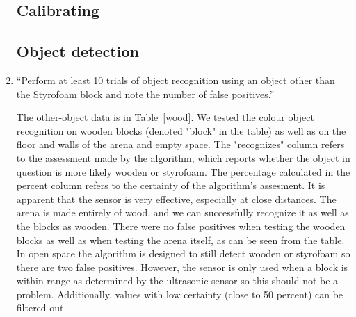 \documentclass[twocolumn]{article}
\begin{document}
\begin{enumerate}

\subsection{Calibrating}









\subsection{Object detection}

\item
``Perform at least 10 trials of object recognition using an object other than the Styrofoam block and note the number of false positives.\cite{lab5}''

The other-object data is in Table~\ref{wood}. We tested the colour object recognition on wooden blocks (denoted "block" in the table) as well as on the floor and walls of the arena and empty space. The "recognizes" column refers to the assessment made by the algorithm, which reports whether the object in question is more likely wooden or styrofoam. The percentage calculated in the percent column refers to the certainty of the algorithm's assesment. It is apparent that the sensor is very effective, especially at close distances. The arena is made entirely of wood, and we can successfully recognize it as well as the blocks as wooden. There were no false positives when testing the wooden blocks as well as when testing the arena itself, as can be seen from the table. In open space the algorithm is designed to still detect wooden or styrofoam so there are two false positives. However, the sensor is only used when a block is within range as determined by the ultrasonic sensor so this should not be a problem. Additionally, values with low certainty (close to 50 percent) can be filtered out.


\end{enumerate}
\end{document}
